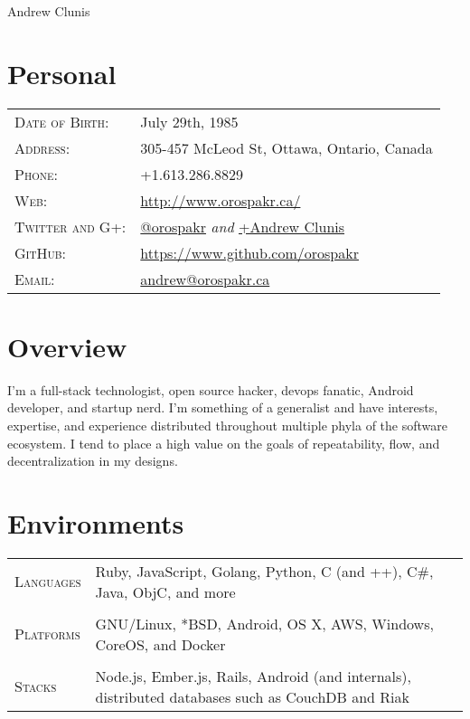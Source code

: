 \documentclass[letterpaper,10pt]{article}
\begin{document}
\pagestyle{empty} %

\par{\centering
{\Huge Andrew \textsc Clunis
}\bigskip\par}

\section{Personal}
\begin{longtable}{p{3cm}|p{12cm}}
  \textsc{Date of Birth:} & July 29th, 1985 \\
  \textsc{Address:} & 305-457 McLeod St, Ottawa, Ontario, Canada \\
  \textsc{Phone:} & +1.613.286.8829 \\
  \textsc{Web:} &  \href{http://www.orospakr.ca/}{http://www.orospakr.ca/} \\
  \textsc{Twitter and G+:} & \href{http://twitter.com/orospakr}{@orospakr} \emph{and} \href{https://plus.google.com/101728978406554574081}{+Andrew Clunis}\\
  \textsc{GitHub:} & \href{https://github.com/orospakr}{https://www.github.com/orospakr} \\
  \textsc{Email:} & \href{mailto:Andrew Clunis <andrew@orospakr.ca>}{andrew@orospakr.ca} \\
\end{longtable}

\section{Overview}
I'm a full-stack technologist, open source hacker, devops fanatic,
Android developer, and startup nerd.  I'm something of a generalist
and have interests, expertise, and experience distributed throughout
multiple phyla of the software ecosystem.  I tend to place a high
value on the goals of repeatability, flow, and decentralization in my
designs.

\section{Environments}
\begin{longtable}{p{3cm}|p{12cm}}
  \textsc{Languages} & Ruby, JavaScript, Golang, Python, C (and ++), C\#, Java, ObjC, and more \\
  \multicolumn{2}{c}{} \\
  \textsc{Platforms} & GNU/Linux, *BSD, Android, OS X, AWS, Windows, CoreOS, and Docker \\
  \multicolumn{2}{c}{} \\
  \textsc{Stacks} & Node.js, Ember.js, Rails, Android (and internals), distributed databases such as CouchDB and Riak \\
\end{longtable}
\end{document}
